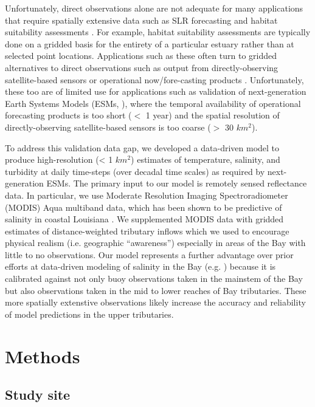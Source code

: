 \documentclass{article}
\begin{document}
Unfortunately, direct observations alone are not adequate for many applications that require spatially extensive data such as SLR forecasting and habitat suitability assessments \cite{hoodChesapeakeBayProgram2021}. For example, habitat suitability assessments are typically done on a gridded basis for the entirety of a particular estuary rather than at selected point locations. Applications such as these often turn to gridded alternatives to direct observations such as output from directly-observing satellite-based sensors \cite{foreCombinedActivePassive2016} or operational now/fore-casting products \cite{lanerolle2011second}. Unfortunately, these too are of limited use for applications such as validation of next-generation Earth Systems Models (ESMs, \cite{golazDOEE3SMModel2022}), where the temporal availability of operational forecasting products is too short ($<$ 1 year) and the spatial resolution of directly-observing satellite-based sensors is too coarse ($>$ 30 $km^2$).

To address this validation data gap, we developed a data-driven model to produce high-resolution (< 1 $km^2$) estimates of temperature, salinity, and turbidity at daily time-steps (over decadal time scales) as required by next-generation ESMs. The primary input to our model is remotely sensed reflectance data. In particular, we use Moderate Resolution Imaging Spectroradiometer (MODIS) Aqua multiband data, which has been shown to be predictive of salinity in coastal Louisiana \cite{vogelAssessingSatelliteSea2016, wangDevelopmentMODISData2018}. We supplemented MODIS data with gridded estimates of distance-weighted tributary inflows which we used to encourage physical realism (i.e. geographic “awareness”) especially in areas of the Bay with little to no observations. Our model represents a further advantage over prior efforts at data-driven modeling of salinity in the Bay (e.g. \cite{vogelAssessingSatelliteSea2016, murphyComparisonSpatialInterpolation2010}) because it is calibrated against not only buoy observations taken in the mainstem of the Bay but also observations taken in the mid to lower reaches of Bay tributaries. These more spatially extenstive observations likely increase the accuracy and reliability of model predictions in the upper tributaries.


\section{Methods}

\subsection{Study site}
\end{document}
